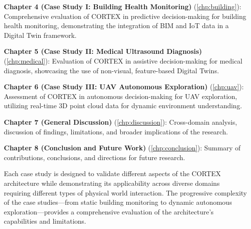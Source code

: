 \textbf{Chapter 4 (Case Study I: Building Health Monitoring)} (\autoref{chp:building}): Comprehensive evaluation of CORTEX in predictive decision-making for building health monitoring, demonstrating the integration of BIM and IoT data in a Digital Twin framework.

\textbf{Chapter 5 (Case Study II: Medical Ultrasound Diagnosis)} (\autoref{chp:medical}): Evaluation of CORTEX in assistive decision-making for medical diagnosis, showcasing the use of non-visual, feature-based Digital Twins.

\textbf{Chapter 6 (Case Study III: UAV Autonomous Exploration)} (\autoref{chp:uav}): Assessment of CORTEX in autonomous decision-making for UAV exploration, utilizing real-time 3D point cloud data for dynamic environment understanding.

\textbf{Chapter 7 (General Discussion)} (\autoref{chp:discussion}): Cross-domain analysis, discussion of findings, limitations, and broader implications of the research.

\textbf{Chapter 8 (Conclusion and Future Work)} (\autoref{chp:conclusion}): Summary of contributions, conclusions, and directions for future research.

Each case study is designed to validate different aspects of the CORTEX architecture while demonstrating its applicability across diverse domains requiring different types of physical world interaction. The progressive complexity of the case studies—from static building monitoring to dynamic autonomous exploration—provides a comprehensive evaluation of the architecture's capabilities and limitations.